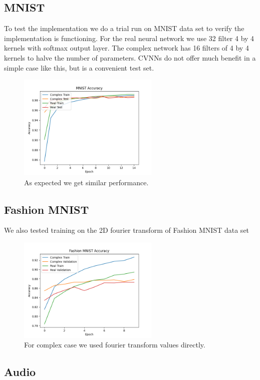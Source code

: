 \documentclass{article}
\let\citep\parencite   %
\begin{document}
\subsection{MNIST}
To test the implementation we do a trial run on MNIST data set to verify the implementation is functioning. For the real neural network we use 32 filter 4 by 4 kernels with softmax output layer. The complex network has 16 filters of 4 by 4 kernels to halve the number of parameters. CVNNs do not offer much benefit in a simple case like this, but is a convenient test set.
\begin{figure}[H]
  \centering
  \includegraphics[width=0.6\textwidth]{../figs/combined.png}
  \caption{As expected we get similar performance.}
\end{figure}
\newpage
\subsection{Fashion MNIST}
We also tested training on the 2D fourier transform of Fashion MNIST data set \citep{fashionmnist}
\begin{figure}[H]
  \centering
  \includegraphics[width=0.6\textwidth]{../figs/fashionmnist.png}
  \caption{For complex case we used fourier transform values directly.}
\end{figure}

\subsection{Audio}
\end{document}
